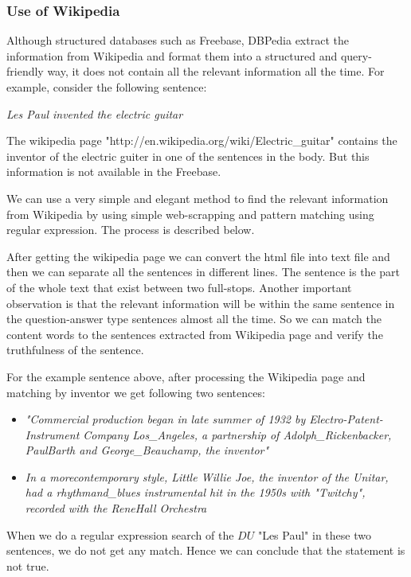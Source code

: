 \documentclass[11pt]{article}
\begin{document}
\subsubsection{Use of Wikipedia}
Although structured databases such as Freebase, DBPedia extract the information from Wikipedia and format them into a structured and query-friendly way, it does not contain all the relevant information all the time. For example, consider the following sentence:

\emph{Les Paul invented the electric guitar}

The wikipedia page "http://en.wikipedia.org/wiki/Electric\_guitar" contains the inventor of the electric guiter in one of the sentences in the body. But this information is not available in the Freebase. 

We can use a very simple and elegant method to find the relevant information from Wikipedia by using simple web-scrapping and pattern matching using regular expression. The process is described below.

After getting the wikipedia page we can convert the html file into text file and then we can separate all the sentences in different lines. The sentence is the part of the whole text that exist between two full-stops. Another important observation is that the relevant information will be within the same sentence in the question-answer type sentences almost all the time. So we can match the content words to the sentences extracted from Wikipedia page and verify the truthfulness of the sentence. 

For the example sentence above, after processing the Wikipedia page and matching by inventor we get following two sentences:
\begin {itemize}
\item \emph{"Commercial production began in late summer of 1932 by Electro-Patent-Instrument Company Los\_Angeles, a partnership of Adolph\_Rickenbacker, PaulBarth and George\_Beauchamp, the inventor"}

\item \emph{In a morecontemporary style, Little Willie Joe, the inventor of the Unitar, had a rhythmand\_blues instrumental hit in the 1950s with "Twitchy", recorded with the ReneHall Orchestra}
\end{itemize}

When we do a regular expression search of the $DU$ "Les Paul" in these two sentences, we do not get any match. Hence we can conclude that the statement is not true. 
 
\end{document}
